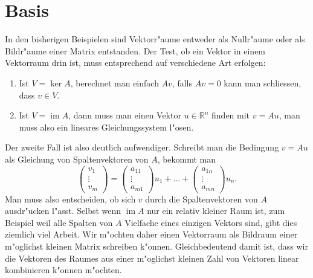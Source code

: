 \section{Basis}
In den bisherigen Beispielen sind Vektorr"aume entweder als Nullr"aume oder
als Bildr"aume einer Matrix entstanden. Der Test, ob ein Vektor in einem
Vektorraum drin ist, muss entsprechend auf verschiedene Art erfolgen:
\begin{enumerate}
\item Ist $V=\operatorname{ker}A$, berechnet man einfach $Av$, falls $Av=0$
kann man schliessen, dass $v\in V$.
\item Ist $V=\operatorname{im}A$, dann muss man einen Vektor $u\in\mathbb R^n$
finden mit $v=Au$, man muss also ein lineares Gleichungssystem l"osen.
\end{enumerate}
Der zweite Fall ist also deutlich aufwendiger. Schreibt man die Bedingung
$v=Au$ als Gleichung von Spaltenvektoren von $A$, bekommt man
\[
\begin{pmatrix}v_1\\\vdots\\v_m\end{pmatrix}
=
\begin{pmatrix}a_{11}\\\vdots\\a_{m1}\end{pmatrix}u_1+\dots+
\begin{pmatrix}a_{1n}\\\vdots\\a_{mn}\end{pmatrix}u_n.
\]
Man muss also entscheiden, ob sich $v$ durch die Spaltenvektoren von
$A$ ausdr"ucken l"asst. Selbst wenn $\operatorname{im}A$ nur ein
relativ kleiner Raum ist, zum Beispiel weil alle Spalten von $A$
Vielfache eines
einzigen Vektors sind, gibt dies ziemlich viel Arbeit. Wir m"ochten
daher einen Vektorraum als Bildraum einer m"oglichst kleinen Matrix
schreiben k"onnen. Gleichbedeutend damit ist, dass wir die Vektoren
des Raumes aus einer m"oglichst kleinen Zahl von Vektoren linear
kombinieren k"onnen m"ochten.

